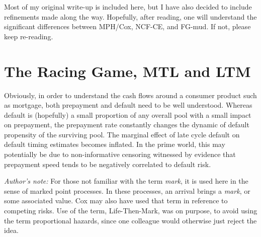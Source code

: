 \documentclass[10pt]{article}
\begin{document}
Most of my original write-up is included here, but I have also decided to include refinements made along 
the way.  
Hopefully, after reading, one will understand the significant differences between MPH/Cox, NCF-CE, and FG-mud.
If not, please keep re-reading.

\section{The Racing Game, MTL and LTM}


Obviously, in order to understand the cash flows around a consumer product such as mortgage, both prepayment and default need to be well understood.
Whereas default is (hopefully) a small proportion of any overall pool with a small impact on prepayment, the prepayment rate 
constantly changes the dynamic of default propensity of the surviving pool.  
The marginal effect of late cycle default 
on default timing estimates becomes inflated. In the prime world, this may potentially be due to non-informative censoring witnessed by evidence 
that prepayment speed tends to be negatively correlated to default risk.  

{\em Author's note:}  For those not familiar with the term {\em mark}, it is used here in the sense of marked point processes. In these
processes, an arrival brings a {\em mark}, or some associated value.  Cox may also have used that term in reference to competing risks.
Use of the term, Life-Then-Mark, was on purpose, to avoid using the term proportional hazards, since one colleague would otherwise just reject the
idea.
\end{document}
